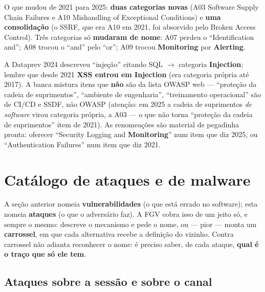 O que mudou de 2021 para 2025: \textbf{duas categorias novas} (A03 Software
Supply Chain Failures e A10 Mishandling of Exceptional Conditions) e
\textbf{uma consolidação} (o SSRF, que era A10 em 2021, foi absorvido pelo
Broken Access Control). Três categorias só \textbf{mudaram de nome}: A07
perdeu o ``Identification and''; A08 trocou o ``and'' pelo ``or''; A09 trocou
\textbf{Monitoring} por \textbf{Alerting}.

\begin{pegadinha}
A Dataprev 2024 descreveu ``injeção'' citando SQL $\to$ categoria
\textbf{Injection}; lembre que desde 2021 \textbf{XSS entrou em Injection}
(era categoria própria até 2017). A banca mistura itens que \textbf{não} são
da lista OWASP web --- ``proteção da cadeia de suprimentos'', ``ambiente de
engenharia'', ``treinamento operacional'' são de CI/CD e SSDF, não OWASP
(atenção: em 2025 a cadeia de suprimentos \emph{de software} virou categoria
própria, a A03 --- o que não torna ``proteção da cadeia de suprimentos'' item
de 2021). As renomeações são material de pegadinha pronta: oferecer
``Security Logging and \textbf{Monitoring}'' num item que diz 2025, ou
``Authentication Failures'' num item que diz 2021.
\end{pegadinha}

\section{Catálogo de ataques e de malware}

A seção anterior nomeia \textbf{vulnerabilidades} (o que está errado no
software); esta nomeia \textbf{ataques} (o que o adversário faz). A FGV cobra
isso de um jeito só, e sempre o mesmo: descreve o mecanismo e pede o nome, ou
--- pior --- monta um \textbf{carrossel}, em que cada alternativa recebe a
definição do vizinho. Contra carrossel não adianta reconhecer o nome: é
preciso saber, de cada ataque, \textbf{qual é o traço que só ele tem}.

\subsection{Ataques sobre a sessão e sobre o canal}

